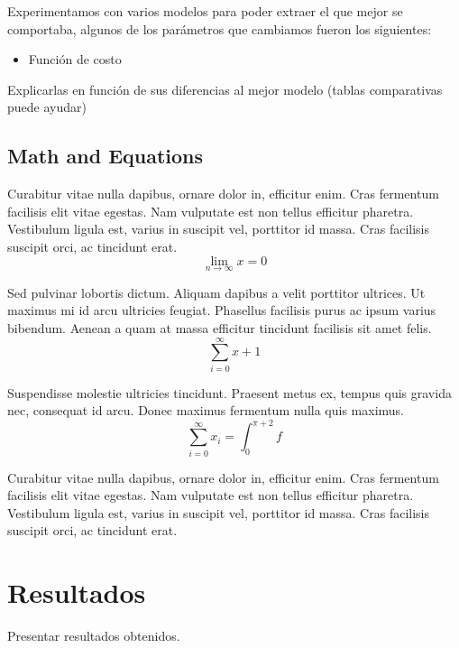 \documentclass[sigconf, nonacm, spanish]{acmart}
\begin{document}
Experimentamos con varios modelos para poder extraer el que mejor se comportaba, algunos de los parámetros que cambiamos fueron los siguientes:

\begin{itemize}
    \item Función de costo
\end{itemize}

Explicarlas en función de sus diferencias al mejor modelo (tablas comparativas puede ayudar)


\subsection{Math and Equations}

Curabitur vitae nulla dapibus, ornare dolor in, efficitur enim. Cras fermentum facilisis elit vitae egestas. Nam vulputate est non tellus efficitur pharetra. Vestibulum ligula est, varius in suscipit vel, porttitor id massa. Cras facilisis suscipit orci, ac tincidunt erat.
\begin{equation}
  \lim_{n\rightarrow \infty}x=0
\end{equation}

Sed pulvinar lobortis dictum. Aliquam dapibus a velit porttitor ultrices. Ut maximus mi id arcu ultricies feugiat. Phasellus facilisis purus ac ipsum varius bibendum. Aenean a quam at massa efficitur tincidunt facilisis sit amet felis. 
\begin{displaymath}
  \sum_{i=0}^{\infty} x + 1
\end{displaymath}

Suspendisse molestie ultricies tincidunt. Praesent metus ex, tempus quis gravida nec, consequat id arcu. Donec maximus fermentum nulla quis maximus.
\begin{equation}
  \sum_{i=0}^{\infty}x_i=\int_{0}^{\pi+2} f
\end{equation}

Curabitur vitae nulla dapibus, ornare dolor in, efficitur enim. Cras fermentum facilisis elit vitae egestas. Nam vulputate est non tellus efficitur pharetra. Vestibulum ligula est, varius in suscipit vel, porttitor id massa. Cras facilisis suscipit orci, ac tincidunt erat.



\section{Resultados}

Presentar resultados obtenidos.
\end{document}
